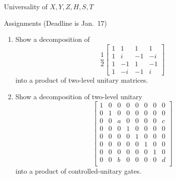 \documentclass{beamer}
\begin{document}
\begin{frame}{Universality of $X,Y,Z,H,S,T$}
\end{frame}

\begin{frame}{Assignments (Deadline is Jan.\ 17)}
\small
\begin{enumerate}
\setlength{\itemsep}{1em}
\item Show a decomposition of
\begin{equation*}
\frac12\begin{bmatrix}
1&1&1&1\\
1&i&-1&-i\\
1&-1&1&-1\\
1&-i&-1&i
\end{bmatrix}
\end{equation*}
into a product of two-level unitary matrices.
\item Show a decomposition of two-level unitary
\begin{equation*}
\begin{bmatrix}
1&0&0&0&0&0&0&0\\
0&1&0&0&0&0&0&0\\
0&0&a&0&0&0&0&c\\
0&0&0&1&0&0&0&0\\
0&0&0&0&1&0&0&0\\
0&0&0&0&0&1&0&0\\
0&0&0&0&0&0&1&0\\
0&0&b&0&0&0&0&d\\
\end{bmatrix}
\end{equation*}
into a product of controlled-unitary gates.
\end{enumerate}
\end{frame}
\end{document}
